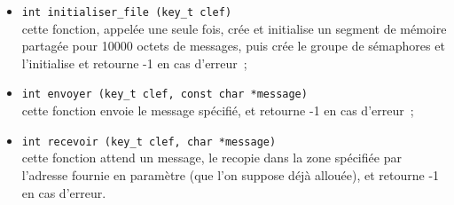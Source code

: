 \begin {itemize}
    \item \verb|int initialiser_file (key_t clef)| \\
	cette fonction, appelée une seule fois, crée et initialise un
	segment de mémoire partagée pour 10000 octets de messages, puis
	crée le groupe de sémaphores et l'initialise et retourne -1 en
	cas d'erreur~;

    \item \verb|int envoyer (key_t clef, const char *message)| \\
	cette fonction envoie le message spécifié, et retourne -1 en cas
	d'erreur~;

    \item \verb|int recevoir (key_t clef, char *message)| \\
	cette fonction attend un message, le recopie dans la zone
	spécifiée par l'adresse fournie en paramètre (que l'on suppose
	déjà allouée), et retourne -1 en cas d'erreur.

\end {itemize}

